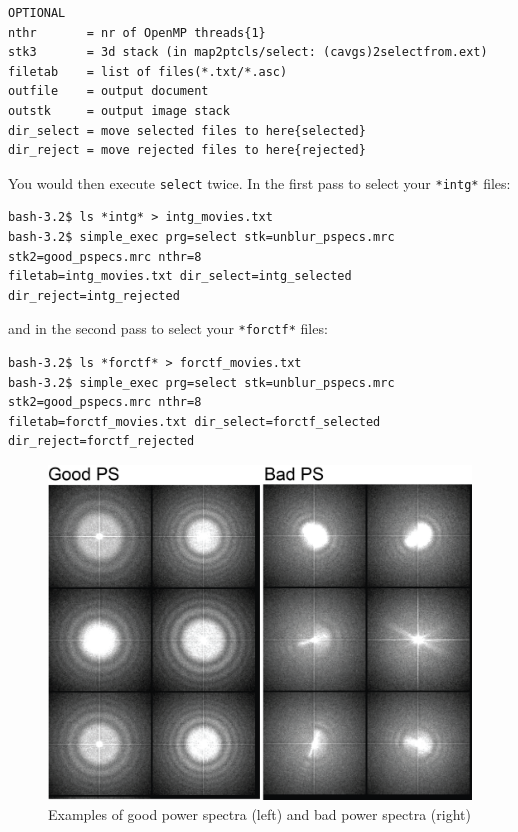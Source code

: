 \documentclass[a4paper,11pt]{article}
\newcommand{\prgname}[1]{\textcolor{NavyBlue}{\texttt{#1}}}
\begin{document}
\begin{tcolorbox}[breakable,colback=white,colframe=orange,width=\dimexpr\textwidth+12mm\relax,enlarge left by=-6mm]
\begin{verbatim}
OPTIONAL
nthr       = nr of OpenMP threads{1}
stk3       = 3d stack (in map2ptcls/select: (cavgs)2selectfrom.ext)
filetab    = list of files(*.txt/*.asc)
outfile    = output document
outstk     = output image stack
dir_select = move selected files to here{selected}
dir_reject = move rejected files to here{rejected}
\end{verbatim}
You would then execute \prgname{select} twice. In the first pass to select your \texttt{*intg*} files:
\begin{verbatim}
bash-3.2$ ls *intg* > intg_movies.txt
bash-3.2$ simple_exec prg=select stk=unblur_pspecs.mrc stk2=good_pspecs.mrc nthr=8 
filetab=intg_movies.txt dir_select=intg_selected dir_reject=intg_rejected
\end{verbatim}
and in the second pass to select your \texttt{*forctf*} files:
\begin{verbatim}
bash-3.2$ ls *forctf* > forctf_movies.txt
bash-3.2$ simple_exec prg=select stk=unblur_pspecs.mrc stk2=good_pspecs.mrc nthr=8 
filetab=forctf_movies.txt dir_select=forctf_selected dir_reject=forctf_rejected
\end{verbatim}
\end{tcolorbox}

\begin{figure}
\includegraphics[keepaspectratio=true,scale=0.6]{./spectra/pspecs}
\caption{Examples of good power spectra (left) and bad power spectra (right)}
\end{figure}
\end{document}
